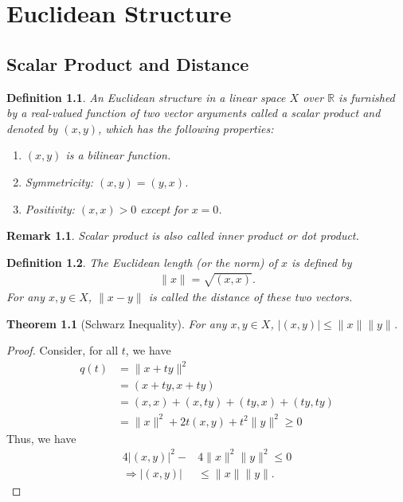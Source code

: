 \documentclass[11pt]{book}
\newtheorem{definition}{Definition}[section]
\newtheorem{theorem}{Theorem}[section]
\newtheorem{remark}{Remark}[section]
\theoremstyle{definition}
\numberwithin{equation}{subsection}
\begin{document}
\medskip

\chapter{Euclidean Structure}
\section{Scalar Product and Distance}
\begin{definition}
An Euclidean structure in a linear space $X$ over $\mathbb{R}$ is furnished by a real-valued function of two vector arguments called a scalar product and denoted by $(x,y)$, which has the following properties:
\begin{enumerate}[label=(\roman*)]
    \item $(x,y)$ is a bilinear function.
    \item Symmetricity: $(x,y) = (y,x)$.
    \item Positivity: $(x,x) > 0$ except for $x = 0$. 
\end{enumerate}
\end{definition}
\begin{remark}
Scalar product is also called inner product or dot product.
\end{remark}

\medskip

\begin{definition}
The Euclidean length (or the norm) of $x$ is defined by 
\begin{align*}
    \|x\| = \sqrt{(x,x)}.
\end{align*}
For any $x,y\in X$, $\|x- y\|$ is called the distance of these two vectors.
\end{definition}

\medskip

\begin{theorem}[Schwarz Inequality]
For any $x,y\in X$, $\left|(x,y)\right| \leq \|x\| \|y\|$.
\end{theorem}
\begin{proof}
Consider, for all $t$, we have
\begin{align*}
    q(t) & = \|x+ty\|^2 \\
    & = (x+ty,x+ty) \\
    & = (x,x) + (x,ty) + (ty,x) + (ty,ty) \\
    & = \|x\|^2 + 2t (x,y) + t^2 \|y\|^2  \geq 0
\end{align*}
Thus, we have 
\begin{align*}
    4\left|(x,y)\right|^2 - & 4 \|x\|^2 \|y\|^2 \leq 0 \\
    \Rightarrow \left|(x,y)\right| & \leq \|x\| \|y\|.
\end{align*}
\end{proof}
\end{document}
